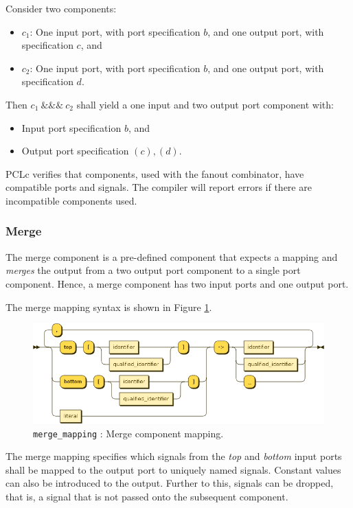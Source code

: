 Consider two components:
\begin{itemize}
\item $c_1$: One input port, with port specification $b$, and one output port, with specification $c$, and
\item $c_2$: One input port, with port specification $b$, and one output port, with specification $d$.
\end{itemize}
Then $c_1\ \&\&\&\ c_2$ shall yield a one input and two output port component with:
\begin{itemize}
\item Input port specification $b$, and
\item Output port specification $(c), (d)$.
\end{itemize}

PCLc verifies that components, used with the fanout combinator, have compatible ports and signals. The compiler will report errors if there are incompatible components used.

\subsubsection{Merge}
The merge component is a pre-defined component that expects a mapping and \emph{merges} the output from a two output port component to a single port component. Hence, a merge component has two input ports and one output port.

The merge mapping syntax is shown in Figure \ref{fig:pcl-merge-mapping}.
\begin{figure}[h!]
  \centering
    \includegraphics[scale=\DiagramScale,angle=90]{chapters/compiler/diagrams/merge_mapping}
  \caption{\texttt{merge\_mapping} : Merge component mapping.}
  \label{fig:pcl-merge-mapping}
\end{figure}
The merge mapping specifies which signals from the \emph{top} and \emph{bottom} input ports shall be mapped to the output port to uniquely named signals. Constant values can also be introduced to the output. Further to this, signals can be dropped, that is, a signal that is not passed onto the subsequent component.

